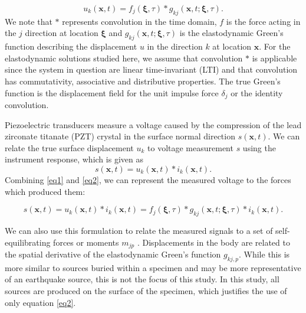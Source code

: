 \documentclass[preprint,3p, 11pt,authoryear]{elsarticle}
\begin{document}
\begin{equation}
\label{eq1}
           u_{k}\left( \mathbf{x}, t \right)  =  
            f_{j}\left( \mathbf{\xi}, \tau \right) \ast 
            g_{kj}\left( \mathbf{x}, t;\mathbf{\xi}, \tau \right).
\end{equation}
\noindent We note that $\ast$ represents convolution in the time domain, $f$ is the force acting in the $j$ direction at location $\mathbf{\xi}$ and $g_{kj}\left( \mathbf{x}, t;\mathbf{\xi}, \tau \right)$ is the elastodynamic Green's function describing the displacement $u$ in the direction $k$ at location $\mathbf{x}$. For the elastodynamic solutions studied here, we assume that convolution $\ast$ is applicable since the system in question are linear time-invariant (LTI) and that convolution has commutativity, associative and distributive properties. The true Green's function is the displacement field for the unit impulse force $\delta_{j}$ or the identity convolution. 

Piezoelectric transducers measure a voltage caused by the compression of the lead zirconate titanate (PZT) crystal in the surface normal direction $s\left( \mathbf{x}, t \right)$. We can relate the true surface displacement $u_{k}$ to voltage measurement $s$ using the instrument response, which is given as
   \begin{equation}
    \label{eq2}
        s\left( \mathbf{x}, t \right) =
            u_{k}\left( \mathbf{x}, t \right) \ast i_{k}\left(\mathbf{x},t \right).
    \end{equation}
    \noindent Combining \eqref{eq1} and \eqref{eq2}, we can represent the measured voltage to the forces which produced them:

    \begin{equation}
    \label{eq3}
        s\left( \mathbf{x}, t \right) =
            u_{k}\left( \mathbf{x}, t \right) \ast i_{k}\left(\mathbf{x}, t \right) =  
                f_{j}\left( \mathbf{\xi}, \tau \right) \ast 
                g_{kj}\left( \mathbf{x}, t;\mathbf{\xi}, \tau \right) \ast i_{k}\left(\mathbf{x},  t \right).
    \end{equation}

\noindent We can also use this formulation to relate the measured signals to a set of self-equilibrating forces or moments $m_{jp}$ \citep{Aki2002}. Displacements in the body are related to the spatial derivative of the elastodynamic Green's function $g_{kj,p}$.  While this is more similar to sources buried within a specimen and may be more representative of an earthquake source, this is not the focus of this study.  In this study, all sources are produced on the surface of the specimen, which justifies the use of only equation \eqref{eq2}.
\end{document}
